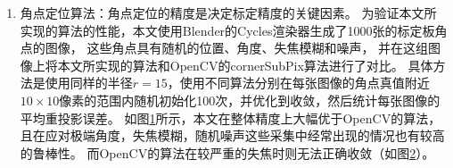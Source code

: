 \begin{enumerate}
\begin{figure}
    \centering
    {corner_fit.pgf}
    \small
    (a) 不同标定板角度下的精度对比\hfill
    (b) 不同失焦模糊下的精度对比\hfill
    (c) 不同噪音下的精度对比
    \caption[OpenCV与本文使用的角点定位算法的精度对比]{
        OpenCV与本文使用的角点定位算法的精度对比。
        带有噪音的图像服从柏松分布，
        增益表示在传感器取得最大读数时接收的电子数量，增益越高，噪声越小。
        在Blender渲染的全部1000张图像中，
        (a)展示了增益$2^{14}$时距离焦平面-0.3至0.2米的图像中，误差与标定版角度的关系；
        (b)展示了增益$2^{14}$时倾斜角度70°以下的图像中，误差与失焦模糊程度的关系；
        (c)展示了距离焦平面-0.3至0.2米且倾斜角度70°以下的图像中，误差与噪音强度的关系。
    }
    \label{fig:corner_fit}
\end{figure}

\begin{figure}
    \centering
    \begin{subfigure}{1.57in}
        {corner_gain-14_0023_opencv.pgf}%
        \caption{OpenCV, 增益$2^{14}$}%
    \end{subfigure}%
    \begin{subfigure}{1.57in}
        {corner_gain-10_0023_opencv.pgf}%
        \caption{OpenCV, 增益$2^{10}$}%
    \end{subfigure}%
    \begin{subfigure}{1.57in}
        {corner_gain-14_0023_saddle.pgf}%
        \caption{本文, 增益$2^{14}$}%
    \end{subfigure}%
    \begin{subfigure}{1.57in}
        {corner_gain-10_0023_saddle.pgf}%
        \caption{本文, 增益$2^{10}$}%
    \end{subfigure}%
    \caption[较严重失焦时的角点定位结果]{
        较严重失焦时的角点定位结果。
        左边两幅图展示了OpenCV的cornerSubPix算法在不同噪音强度时的结果，
        右边两幅图展示了本文所实现的算法的结果。
        可见OpenCV无法正确收敛，在同等半径参数下，本文所实现的算法可处理更大的失焦程度。
    }
    \label{fig:corner_blur}
\end{figure}

\item 角点定位算法：角点定位的精度是决定标定精度的关键因素。
为验证本文所实现的算法的性能，本文使用Blender的Cycles渲染器生成了1000张的标定板角点的图像，
这些角点具有随机的位置、角度、失焦模糊和噪声，
并在这组图像上将本文所实现的算法和OpenCV的cornerSubPix算法进行了对比。
具体方法是使用同样的半径$r=15$，使用不同算法分别在每张图像的角点真值附近$10\times 10$像素的范围内随机初始化100次，并优化到收敛，然后统计每张图像的平均重投影误差。
如图\ref{fig:corner_fit}所示，本文在整体精度上大幅优于OpenCV的算法，且在应对极端角度，失焦模糊，随机噪声这些采集中经常出现的情况也有较高的鲁棒性。
而OpenCV的算法在较严重的失焦时则无法正确收敛（如图\ref{fig:corner_blur}）。


\end{enumerate}
